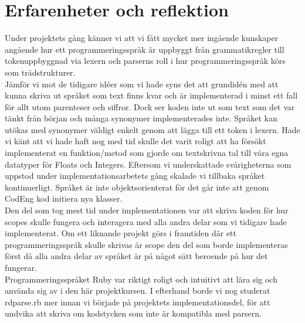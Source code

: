 \documentclass{article}
\begin{document}
\section{Erfarenheter och reflektion}
\begin{flushleft}
Under projektets gång känner vi att vi fått mycket mer ingående kunskaper angående hur ett programmeringsspråk är uppbyggt från grammatikregler till tokenuppbyggnad via lexern och parserns roll i hur programmeringsspråk körs som trädstrukturer.
\\ \newline
Jämför vi mot de tidigare idéer som vi hade syns det att grundidén med att kunna skriva ut språket som text finns kvar och är implementerad i minst ett fall för allt utom parenteser och siffror. Dock ser koden inte ut som  text som det var tänkt från början och många synonymer implementerades inte. Språket kan utökas med synonymer väldigt enkelt genom att lägga till ett token i lexern. Hade vi känt att vi hade haft nog med tid skulle det varit roligt att ha försökt implementerat en funktion/metod som gjorde om textskrivna tal till våra egna datatyper för Floats och Integers. Eftersom vi underskattade svårigheterna som uppstod under implementationsarbetets gång skalade vi tillbaka språket kontinuerligt. Språket är inte objektsorienterat för det går inte att genom CodEng kod initiera nya klasser. \\ \newline
Den del som tog mest tid under implementationen var att skriva koden för hur scopes skulle fungera och interagera med alla andra delar som vi tidigare hade implementerat. Om ett liknande projekt görs i framtiden där ett programmeringsspråk skulle skrivas är scope den del som borde implementeras först då alla andra delar av språket är på något sätt beroende på hur det fungerar. \\ \newline
Programmeringsspråket Ruby var riktigt roligt och intuitivt att lära sig och använda sig av i den här projektkursen. I efterhand borde vi nog studerat rdparse.rb mer innan vi började på projektets implementationsdel, för att undvika att skriva om kodstycken som inte är kompatibla med parsern.
\end{flushleft}
\end{document}
